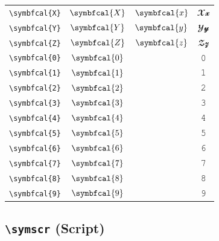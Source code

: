 \documentclass[12pt,a4paper]{article}
\begin{document}
\begin{longtable}{|c|c|c|c|}
\verb|\symbfcal{X}| & $\symbfcal{X}$ & $\symbfcal{x}$ & $ 𝓧 𝔁 $ \\
\verb|\symbfcal{Y}| & $\symbfcal{Y}$ & $\symbfcal{y}$ & $ 𝓨 𝔂 $ \\
\verb|\symbfcal{Z}| & $\symbfcal{Z}$ & $\symbfcal{z}$ & $ 𝓩 𝔃 $ \\
\verb|\symbfcal{0}| & $\symbfcal{0}$ & & 𝟶 \\
\verb|\symbfcal{1}| & $\symbfcal{1}$ & & 𝟷 \\
\verb|\symbfcal{2}| & $\symbfcal{2}$ & & 𝟸 \\
\verb|\symbfcal{3}| & $\symbfcal{3}$ & & 𝟹 \\
\verb|\symbfcal{4}| & $\symbfcal{4}$ & & 𝟺 \\
\verb|\symbfcal{5}| & $\symbfcal{5}$ & & 𝟻 \\
\verb|\symbfcal{6}| & $\symbfcal{6}$ & & 𝟼 \\
\verb|\symbfcal{7}| & $\symbfcal{7}$ & & 𝟽 \\
\verb|\symbfcal{8}| & $\symbfcal{8}$ & & 𝟾 \\
\verb|\symbfcal{9}| & $\symbfcal{9}$ & & 𝟿 \\
\hline
\end{longtable}

\newpage

\subsection*{\texttt{\textbackslash{}symscr} (Script)}
\end{document}
